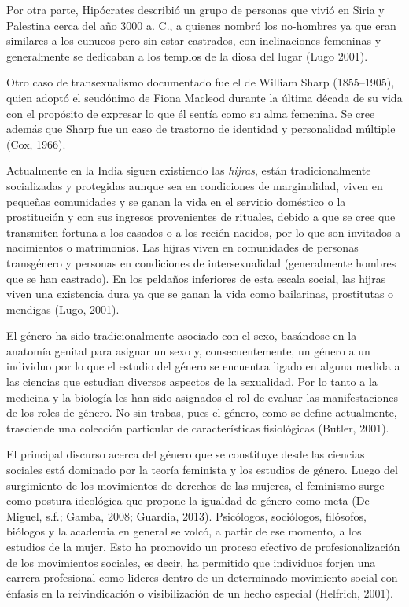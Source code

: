 Por otra parte, Hipócrates describió un grupo de personas que vivió en Siria
y Palestina cerca del año 3000 a. C., a quienes nombró los no-hombres ya que
eran  similares a los eunucos pero sin estar castrados, con inclinaciones
femeninas y generalmente se dedicaban a los templos de la diosa del lugar (Lugo
2001).

Otro caso de transexualismo documentado fue el de William Sharp (1855--1905),
quien adoptó el seudónimo de Fiona Macleod durante la última década de su vida
con el propósito de expresar lo que él sentía como su alma femenina.
Se cree además que Sharp fue un caso de trastorno de identidad y personalidad
múltiple (Cox, 1966).

Actualmente en la India siguen existiendo las \emph{hijras}, están tradicionalmente
socializadas y protegidas aunque sea en condiciones de marginalidad, viven en
pequeñas comunidades y se ganan la vida en el servicio doméstico o la
prostitución y con sus ingresos provenientes de rituales, debido a que se cree
que transmiten fortuna a los casados o a los recién nacidos, por lo que son
invitados a nacimientos o matrimonios.
Las hijras viven en comunidades de personas transgénero y personas en
condiciones de intersexualidad (generalmente hombres que se han castrado).
En los peldaños inferiores de esta escala social, las hijras viven una
existencia dura ya que se ganan la vida como bailarinas, prostitutas o mendigas
(Lugo, 2001).

El género ha sido tradicionalmente asociado con el sexo, basándose en la
anatomía genital para asignar un sexo y, consecuentemente, un género a un
individuo por lo que el estudio del género se encuentra ligado en alguna medida
a las ciencias que estudian diversos aspectos de la sexualidad.
Por lo tanto a la medicina y la biología les han sido asignados el rol de
evaluar las manifestaciones de los roles de género.
No sin trabas, pues el género, como se define actualmente, trasciende una
colección particular de características fisiológicas (Butler, 2001).

El principal discurso acerca del género que se constituye desde las ciencias
sociales está dominado por la teoría feminista y los estudios de género.
Luego del surgimiento de los movimientos de derechos de las mujeres, el
feminismo surge como postura ideológica que propone la igualdad de género como
meta (De Miguel, s.f.; Gamba, 2008; Guardia, 2013).
Psicólogos, sociólogos, filósofos, biólogos y la academia en general se volcó, a
partir de ese momento, a los estudios de la mujer.
Esto ha promovido un proceso efectivo de profesionalización de los movimientos
sociales, es decir, ha permitido que individuos forjen una carrera profesional
como lideres dentro de un determinado movimiento social con énfasis en la
reivindicación o visibilización de un hecho especial (Helfrich, 2001).

